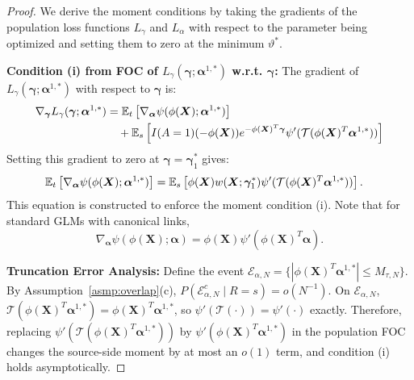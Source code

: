 \documentclass{article}
\begin{document}
\begin{proof}
We derive the moment conditions by taking the gradients of the population loss functions $L_\gamma$ and $L_\alpha$ with respect to the parameter being optimized and setting them to zero at the minimum $\vartheta^*$.

\textbf{Condition (i) from FOC of $L_{\gamma}(\boldsymbol{\gamma}; \boldsymbol{\alpha}^{1,*})$ w.r.t. $\boldsymbol{\gamma}$:}
The gradient of $L_{\gamma}(\boldsymbol{\gamma}; \boldsymbol{\alpha}^{1,*})$ with respect to $\boldsymbol{\gamma}$ is:
\[
\begin{aligned}
\nabla_{\boldsymbol{\gamma}} L_{\gamma}(\boldsymbol{\gamma}; \boldsymbol{\alpha}^{1,*})
&= \operatorname{\mathbb{E}}_t \left[ \nabla_{\boldsymbol{\alpha}} \psi(\phi(\boldsymbol{X}); \boldsymbol{\alpha}^{1,*}) \right] \\
&\quad + \operatorname{\mathbb{E}}_{s} \left[ I(A=1) (-\phi(\boldsymbol{X})) e^{-\phi(\boldsymbol{X})^T \boldsymbol{\gamma}} \psi'(\mathcal{T}(\phi(\boldsymbol{X})^T \boldsymbol{\alpha}^{1,*})) \right]
\end{aligned}
\]
Setting this gradient to zero at $\boldsymbol{\gamma} = \boldsymbol{\gamma}_1^*$ gives:
\[
\begin{aligned}
\operatorname{\mathbb{E}}_t \left[ \nabla_{\boldsymbol{\alpha}} \psi(\phi(\boldsymbol{X}); \boldsymbol{\alpha}^{1,*}) \right]
&= \operatorname{\mathbb{E}}_{s} \left[ \phi(\boldsymbol{X}) w(\boldsymbol{X}; \boldsymbol{\gamma}_1^*) \psi'(\mathcal{T}(\phi(\boldsymbol{X})^T \boldsymbol{\alpha}^{1,*})) \right].
\end{aligned}
\]
This equation is constructed to enforce the moment condition (i). Note that for standard GLMs with canonical links,
\[
\nabla_{\boldsymbol{\alpha}} \psi(\phi(\boldsymbol{X}); \boldsymbol{\alpha}) = \phi(\boldsymbol{X}) \psi'(\phi(\boldsymbol{X})^T \boldsymbol{\alpha}).
\]

\textbf{Truncation Error Analysis:} Define the event $\mathcal{E}_{\alpha,N} = \{|\phi(\boldsymbol{X})^T \boldsymbol{\alpha}^{1,*}| \le M_{\tau,N}\}$. By Assumption~\ref{asmp:overlap}(c), $P(\mathcal{E}_{\alpha,N}^c \mid R=s)=o(N^{-1})$. On $\mathcal{E}_{\alpha,N}$, $\mathcal{T}(\phi(\boldsymbol{X})^T \boldsymbol{\alpha}^{1,*}) = \phi(\boldsymbol{X})^T \boldsymbol{\alpha}^{1,*}$, so $\psi'(\mathcal{T}(\cdot)) = \psi'(\cdot)$ exactly. Therefore, replacing $\psi'(\mathcal{T}(\phi(\boldsymbol{X})^T \boldsymbol{\alpha}^{1,*}))$ by $\psi'(\phi(\boldsymbol{X})^T \boldsymbol{\alpha}^{1,*})$ in the population FOC changes the source-side moment by at most an $o(1)$ term, and condition (i) holds asymptotically.


\end{proof}
\end{document}
